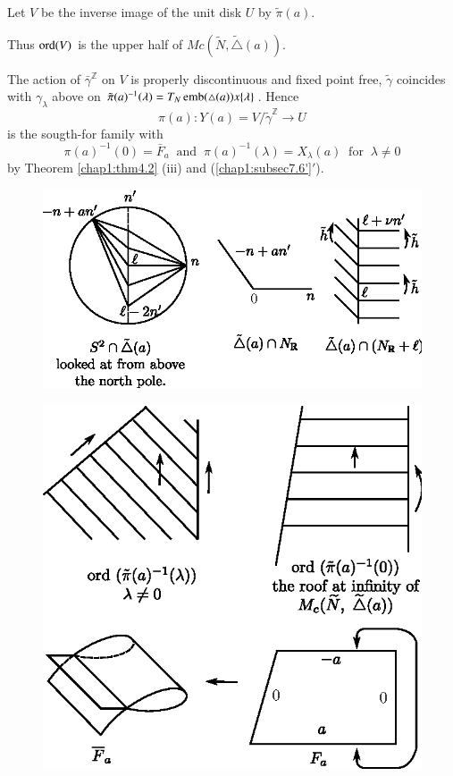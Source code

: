 \noindent
Let $V$ be the inverse image of the unit disk $U$ by $\tilde{\pi}(a)$.  
 
\noindent
Thus $\operatorname{ord} (V)$ is the upper half of $Mc (\tilde{N},
\tilde{\triangle}(a))$.  
 
The action of $\bar{\gamma}^{\mathbb{Z}}$ on $V$ is properly
discontinuous and fixed point free, $\tilde{\gamma}$ coincides with
$\gamma_{\lambda}$ above on $\tilde{\pi}(a)^{-1}(\lambda) = T_{N}
\operatorname{emb} (\triangle (a)) x \{\lambda\}$. Hence  
$$
\pi (a) : Y (a) = V/ \tilde{\gamma}^{\mathbb{Z}} \to U 
$$
is the sougth-for family with 
$$
 \pi (a)^{-1} (0) = \bar{F}_{a}~ \text{ and }~ \pi (a)^{-1} (\lambda) 
 = X_{\lambda}(a) ~\text{ for }~ \lambda \neq 0 
$$
by Theorem \ref{chap1:thm4.2} (iii) and (\ref{chap1:subsec7.6'}$'$). 
 \begin{figure}[H]
\centering 
\includegraphics{vol58-fig/fig58-70.eps} 
\end{figure}
 \begin{figure}[H]
\centering 
\includegraphics{vol58-fig/fig58-71.eps} 
\end{figure}\pageoriginale

